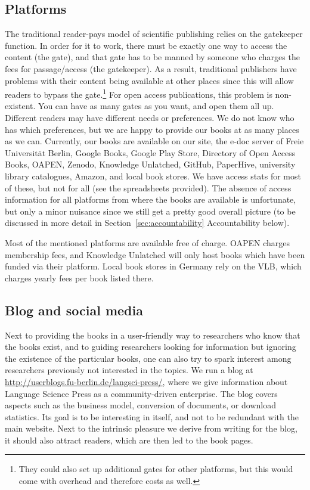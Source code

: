 \documentclass[nonflat,modfonts,output=book] {langsci/langscibook}
\begin{document}
\subsection{Platforms}
The traditional reader-pays model of scientific publishing relies on the gatekeeper function. In order for it to work, there must be exactly one way to access the content (the gate), and that gate has to be manned by someone who charges the fees for passage\slash access (the gatekeeper). As a result, traditional publishers have problems with their content being available at other places since this will allow readers to bypass the gate.\footnote{They could also set up additional gates for other platforms, but this would come with overhead and therefore costs as well.} For open access publications, this problem is non-existent. You can have as many gates as you want, and open them all up. Different readers may have different needs or preferences. We do not know who has which preferences, but we are happy to provide our books at as many places as we can. Currently, our books are available on our site, the e-doc server of Freie Universität Berlin, Google Books, Google Play Store, Directory of Open Access Books, OAPEN, Zenodo, Knowledge Unlatched, GitHub, PaperHive, university library catalogues, Amazon, and local book stores. We have access stats for most of these, but not for all (see the spreadsheets provided). The absence of access information for all platforms from where the books are available is unfortunate, but only a minor nuisance since we still get a pretty good overall picture (to be discussed in more detail in Section~\ref{sec:accountability} Accountability below).

Most of the mentioned platforms are available free of charge. OAPEN charges membership fees, and Knowledge Unlatched will only host books which have been funded via their platform. Local book stores in Germany rely on the VLB, which charges yearly fees per book   listed there.

\subsection{Blog and social media}
Next to providing the books in a user-friendly way to researchers who know that the books exist, and to guiding researchers looking for information but ignoring the existence of the particular books, one can also try to spark interest among researchers previously not interested in the topics. We run a blog at \url{http://userblogs.fu-berlin.de/langsci-press/}, where we give information about Language Science Press as a community-driven enterprise. The blog covers aspects such as the business model, conversion of documents, or download statistics. Its goal is to be interesting in itself, and not to be redundant with the main website. Next to the intrinsic pleasure we derive from writing for the blog, it should also attract readers, which are then led to the book pages.  
\end{document}
